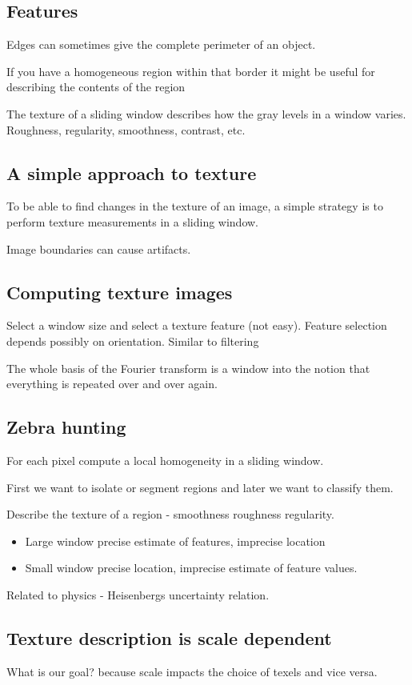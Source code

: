 \documentclass[a4paper,11pt]{article}
\begin{document}
	\subsection{Features}
	Edges can sometimes give the complete perimeter of an object.
	
	If you have a homogeneous region within that border it might be useful for describing the contents of the region
	
	The texture of a sliding window describes how the gray levels in a window varies. Roughness, regularity, smoothness, contrast, etc.
	
	\subsection{A simple approach to texture}
	To be able to find changes in the texture of an image, a simple strategy is to perform texture measurements in a sliding window.
	
	Image boundaries can cause artifacts.
	
	\subsection{Computing texture images}
	Select a window size and select a texture feature (not easy). Feature selection depends possibly on orientation.
	Similar to filtering
	
	The whole basis of the Fourier transform is a window into the notion that everything is repeated over and over again.
	
	\subsection{Zebra hunting}
	For each pixel compute a local homogeneity in a sliding window.
	
	First we want to isolate or segment regions and later we want to classify them.
	
	Describe the texture of a region - smoothness roughness regularity.
	\begin{itemize}
		\item Large window precise estimate of features, imprecise location
		\item Small window precise location, imprecise estimate of feature values.
	\end{itemize}
	
	Related to physics - Heisenbergs uncertainty relation.
	
	\subsection{Texture description is scale dependent}
	What is our goal? because scale impacts the choice of texels and vice versa.
	
\end{document}

